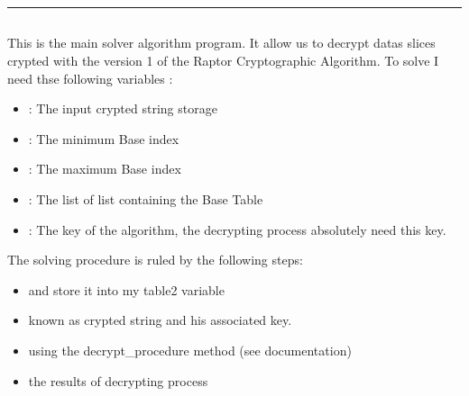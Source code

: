 \documentclass[letterpaper,10pt,english]{sphinxmanual}
\begin{document}
\bigskip\hrule\bigskip



\subsection{}
\label{\detokenize{DescriptionofDecrypterv2:algorithm}}
\sphinxAtStartPar
This is the main solver algorithm program.
It allow us to decrypt datas slices crypted with the version 1 of the Raptor Cryptographic Algorithm.
To solve I need thse following variables :
\begin{itemize}
\item {} 
\sphinxAtStartPar
{} : The input crypted string storage

\item {} 
\sphinxAtStartPar
{} : The minimum Base index

\item {} 
\sphinxAtStartPar
{} : The maximum Base index

\item {} 
\sphinxAtStartPar
{} : The list of list containing the Base Table

\item {} 
\sphinxAtStartPar
{} : The key of the algorithm, the decrypting process absolutely need this key.

\end{itemize}

\sphinxAtStartPar
The solving procedure is ruled by the following steps:
\begin{itemize}
\item {} 
\sphinxAtStartPar
{} and store it into my table2 variable

\item {} 
\sphinxAtStartPar
{} known as crypted string and his associated key.

\item {} 
\sphinxAtStartPar
{} using the decrypt\_procedure method (see documentation)

\item {} 
\sphinxAtStartPar
{} the results of decrypting process

\end{itemize}
\end{document}
